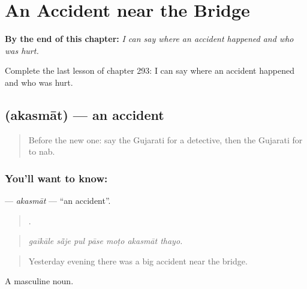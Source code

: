 
\chapter{An Accident near the Bridge}
\label{ch:gu-an-accident-near-the-bridge}

\begin{chapteropening}
\textbf{By the end of this chapter:} \emph{I can say where an accident happened and who was hurt.}

Complete the last lesson of chapter 293: I can say where an accident happened and who was hurt.
\end{chapteropening}

\section[\texorpdfstring{\gu{અકસ્માત} (akasmāt)}{અકસ્માત (akasmāt)}]{ (akasmāt) — an accident}

\label{lesson:GU-C293-akasmat}



\begin{quote}
Before the new one: say the Gujarati for a detective, then the Gujarati for to nab.
\end{quote}

\subsection*{You'll want to know: }
\textbf{} — \emph{akasmāt} — \textquotedblleft{}an accident\textquotedblright{}.

\begin{quote}
      .
\end{quote}

\begin{quote}
\emph{gaīkāle sā̃je pul pāse moṭo akasmāt thayo.}
\end{quote}

\begin{quote}
Yesterday evening there was a big accident near the bridge.
\end{quote}

A masculine noun.

